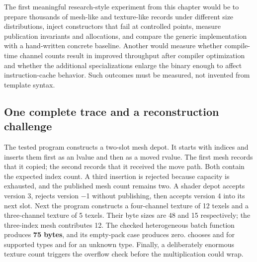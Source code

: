 The first meaningful research-style experiment from this chapter would be to prepare thousands of mesh-like and texture-like records under different size distributions, inject constructors that fail at controlled points, measure publication invariants and allocations, and compare the generic implementation with a hand-written concrete baseline. Another would measure whether compile-time channel counts result in improved throughput after compiler optimization and whether the additional specializations enlarge the binary enough to affect instruction-cache behavior. Such outcomes must be measured, not invented from template syntax.

\subsection{One complete trace and a reconstruction challenge}\label{01-foundations-i-ch005-one-complete-trace-and-a-reconstruction-challenge}

\hypertarget{01-foundations-i-ch005-one-complete-trace-and-a-reconstruction-challenge}{}

The tested program constructs a two-slot mesh depot. It starts with indices  and inserts them first as an lvalue and then as a moved rvalue. The first mesh records that it copied; the second records that it received the move path. Both contain the expected index count. A third insertion is rejected because capacity is exhausted, and the published mesh count remains two. A shader depot accepts version 3, rejects version −1 without publishing, then accepts version 4 into its next slot. Next the program constructs a four-channel texture of 12 texels and a three-channel texture of 5 texels. Their byte sizes are 48 and 15 respectively; the three-index mesh contributes 12. The checked heterogeneous batch function produces \textbf{75 bytes}, and its empty-pack case produces zero.  chooses  and  for supported types and  for an unknown type. Finally, a deliberately enormous texture count triggers the overflow check before the multiplication could wrap.

